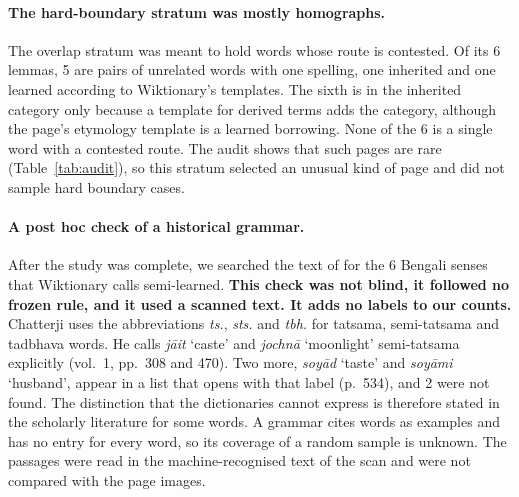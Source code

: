 \documentclass[11pt]{article}
\newcommand{\gl}[1]{`#1'}
\begin{document}
\paragraph{The hard-boundary stratum was mostly homographs.} The overlap stratum was meant to hold words whose route is contested. Of its 6 lemmas, 5 are pairs of unrelated words with one spelling, one inherited and one learned according to Wiktionary's templates. The sixth is in the inherited category only because a template for derived terms adds the category, although the page's etymology template is a learned borrowing. None of the 6 is a single word with a contested route. The audit shows that such pages are rare (Table~\ref{tab:audit}), so this stratum selected an unusual kind of page and did not sample hard boundary cases.

\paragraph{A post hoc check of a historical grammar.} After the study was complete, we searched the text of \citet{chatterji1926} for the 6 Bengali senses that Wiktionary calls semi-learned. \textbf{This check was not blind, it followed no frozen rule, and it used a scanned text. It adds no labels to our counts.} Chatterji uses the abbreviations \textit{ts.}, \textit{sts.} and \textit{tbh.} for tatsama, semi-tatsama and tadbhava words. He calls \textit{j\=ait} \gl{caste} and \textit{jochn\=a} \gl{moonlight} semi-tatsama explicitly (vol.~1, pp.~308 and 470). Two more, \textit{soy\=ad} \gl{taste} and \textit{soy\=ami} \gl{husband}, appear in a list that opens with that label (p.~534), and 2 were not found. The distinction that the dictionaries cannot express is therefore stated in the scholarly literature for some words. A grammar cites words as examples and has no entry for every word, so its coverage of a random sample is unknown. The passages were read in the machine-recognised text of the scan and were not compared with the page images.
\end{document}

